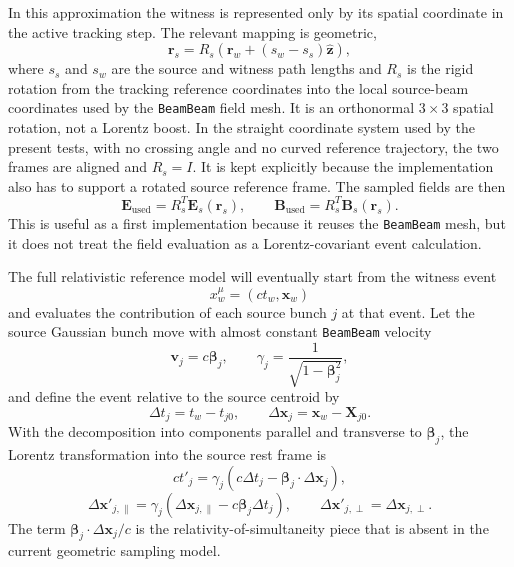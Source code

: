 \documentclass[11pt]{article}
\newcommand{\vect}[1]{\boldsymbol{#1}}
\newcommand{\E}{\vect{E}}
\newcommand{\B}{\vect{B}}
\newcommand{\betav}{\boldsymbol{\beta}}
\numberwithin{equation}{section}
\begin{document}
In this approximation the witness is represented only by its spatial coordinate
in the active tracking step.  The relevant mapping is geometric,
\begin{equation}
  \vect r_s = R_s\left(\vect r_w + (s_w-s_s)\hat{\vect z}\right),
\end{equation}
where \(s_s\) and \(s_w\) are the source and witness path lengths and \(R_s\)
is the rigid rotation from the tracking reference coordinates into the local
source-beam coordinates used by the \texttt{BeamBeam} field mesh.  It is an
orthonormal \(3\times3\) spatial rotation, not a Lorentz boost.  In the straight
coordinate system used by the present tests, with no crossing angle and no
curved reference trajectory, the two frames are aligned and \(R_s=I\).  It is
kept explicitly because the implementation also has to support a rotated source
reference frame.  The sampled fields are then
\begin{equation}
  \E_{\mathrm{used}} = R_s^T \E_s(\vect r_s),
  \qquad
  \B_{\mathrm{used}} = R_s^T \B_s(\vect r_s).
\end{equation}
This is useful as a first implementation because it reuses the \texttt{BeamBeam} mesh,
but it does not treat the field evaluation as a Lorentz-covariant event
calculation.

The full relativistic reference model will eventually start from the witness event
\begin{equation}
  x_w^\mu=(c t_w,\vect x_w)
\end{equation}
and evaluates the contribution of each source bunch \(j\) at that event.  Let
the source Gaussian bunch move with almost constant \texttt{BeamBeam} velocity
\begin{equation}
  \vect v_j = c\betav_j,
  \qquad
  \gamma_j = \frac{1}{\sqrt{1-\betav_j^2}},
\end{equation}
and define the event relative to the source centroid by
\begin{equation}
  \Delta t_j = t_w - t_{j0},
  \qquad
  \Delta \vect x_j = \vect x_w-\vect X_{j0}.
\end{equation}
With the decomposition into components parallel and transverse to
\(\betav_j\), the Lorentz transformation into the source rest frame is
\begin{equation}
  c t'_j =
  \gamma_j\left(c\Delta t_j-\betav_j\cdot\Delta\vect x_j\right),
\end{equation}
\begin{equation}
  \Delta \vect x'_{j,\parallel}
  =
  \gamma_j\left(\Delta \vect x_{j,\parallel}
  - c\betav_j\Delta t_j\right),
  \qquad
  \Delta \vect x'_{j,\perp}=\Delta \vect x_{j,\perp}.
\end{equation}
The term \(\betav_j\cdot\Delta\vect x_j/c\) is the relativity-of-simultaneity
piece that is absent in the current geometric sampling model.
\end{document}
